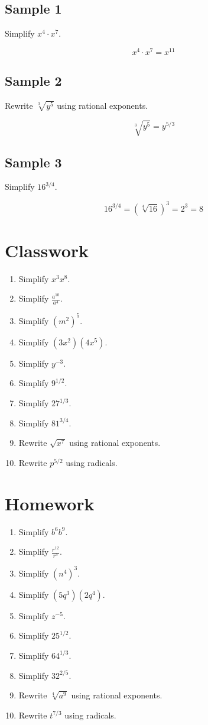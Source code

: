 \documentclass[11pt]{book}
\begin{document}
\subsection{Sample 1}

Simplify \(x^4\cdot x^7\).

\[x^4\cdot x^7=x^{11}\]

\subsection{Sample 2}

Rewrite \(\sqrt[3]{y^5}\) using rational exponents.

\[\sqrt[3]{y^5}=y^{5/3}\]

\subsection{Sample 3}

Simplify \(16^{3/4}\).

\[16^{3/4}=(\sqrt[4]{16})^3=2^3=8\]

\section{Classwork}

\begin{enumerate}
\item Simplify \(x^3x^8\).
\item Simplify \(\frac{a^{10}}{a^4}\).
\item Simplify \((m^2)^5\).
\item Simplify \((3x^2)(4x^5)\).
\item Simplify \(y^{-3}\).
\item Simplify \(9^{1/2}\).
\item Simplify \(27^{1/3}\).
\item Simplify \(81^{3/4}\).
\item Rewrite \(\sqrt{x^7}\) using rational exponents.
\item Rewrite \(p^{5/2}\) using radicals.
\end{enumerate}

\section{Homework}

\begin{enumerate}
\item Simplify \(b^6b^9\).
\item Simplify \(\frac{r^{12}}{r^5}\).
\item Simplify \((n^4)^3\).
\item Simplify \((5q^3)(2q^4)\).
\item Simplify \(z^{-5}\).
\item Simplify \(25^{1/2}\).
\item Simplify \(64^{1/3}\).
\item Simplify \(32^{2/5}\).
\item Rewrite \(\sqrt[4]{a^9}\) using rational exponents.
\item Rewrite \(t^{7/3}\) using radicals.
\end{enumerate}
\end{document}
